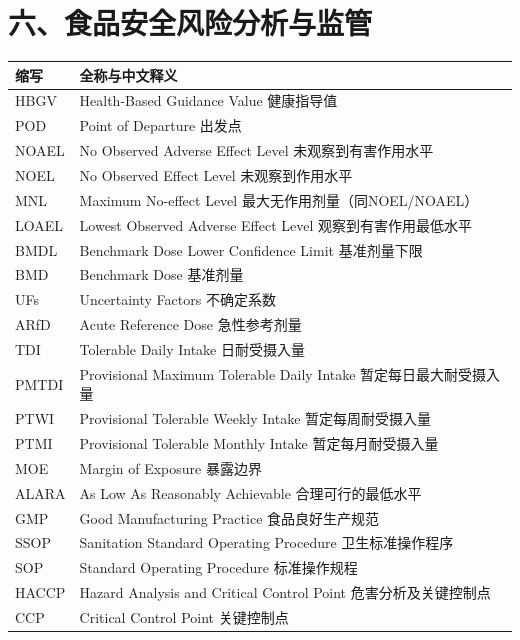 \section{六、食品安全风险分析与监管}

\begin{table}[H]
\centering
\begin{tabularx}{\textwidth}{lX}
\toprule
\textbf{缩写} & \textbf{全称与中文释义} \\
\midrule
HBGV & Health-Based Guidance Value \hfill 健康指导值 \\
POD & Point of Departure \hfill 出发点 \\
NOAEL & No Observed Adverse Effect Level \hfill 未观察到有害作用水平 \\
NOEL & No Observed Effect Level \hfill 未观察到作用水平 \\
MNL & Maximum No-effect Level \hfill 最大无作用剂量（同NOEL/NOAEL） \\
LOAEL & Lowest Observed Adverse Effect Level \hfill 观察到有害作用最低水平 \\
BMDL & Benchmark Dose Lower Confidence Limit \hfill 基准剂量下限 \\
BMD & Benchmark Dose \hfill 基准剂量 \\
UFs & Uncertainty Factors \hfill 不确定系数 \\
ARfD & Acute Reference Dose \hfill 急性参考剂量 \\
TDI & Tolerable Daily Intake \hfill 日耐受摄入量 \\
PMTDI & Provisional Maximum Tolerable Daily Intake \hfill 暂定每日最大耐受摄入量 \\
PTWI & Provisional Tolerable Weekly Intake \hfill 暂定每周耐受摄入量 \\
PTMI & Provisional Tolerable Monthly Intake \hfill 暂定每月耐受摄入量 \\
MOE & Margin of Exposure \hfill 暴露边界 \\
ALARA & As Low As Reasonably Achievable \hfill 合理可行的最低水平 \\
GMP & Good Manufacturing Practice \hfill 食品良好生产规范 \\
SSOP & Sanitation Standard Operating Procedure \hfill 卫生标准操作程序 \\
SOP & Standard Operating Procedure \hfill 标准操作规程 \\
HACCP & Hazard Analysis and Critical Control Point \hfill 危害分析及关键控制点 \\
CCP & Critical Control Point \hfill 关键控制点 \\

\end{tabularx}
\end{table}
